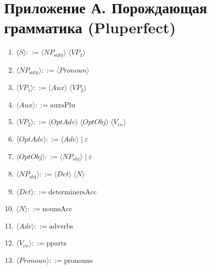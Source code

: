 \documentclass[areasetadvanced]{scrartcl}
\begin{document}
\newpage
\section*{Приложение А. Порождающая грамматика (Pluperfect)}
\begin{enumerate}
  \item $\langle S\rangle            ::= \langle NP_{\text{subj}}\rangle\;\langle VP_1\rangle$
  \item $\langle NP_{\text{subj}}\rangle ::= \langle Pronoun\rangle$
  \item $\langle VP_1\rangle         ::= \langle Aux\rangle\;\langle VP_2\rangle$
  \item $\langle Aux\rangle          ::= \text{auxsPlu}$
  \item $\langle VP_2\rangle         ::= \langle OptAdv\rangle\;\langle OptObj\rangle\;\langle V_{en}\rangle$
  \item $\langle OptAdv\rangle       ::= \langle Adv\rangle \;|\; \varepsilon$
  \item $\langle OptObj\rangle       ::= \langle NP_{\text{obj}}\rangle \;|\; \varepsilon$
  \item $\langle NP_{\text{obj}}\rangle ::= \langle Det\rangle\;\langle N\rangle$
  \item $\langle Det\rangle          ::= \text{determinersAcc}$
  \item $\langle N\rangle            ::= \text{nounsAcc}$
  \item $\langle Adv\rangle          ::= \text{adverbs}$
  \item $\langle V_{en}\rangle       ::= \text{pparts}$
  \item $\langle Pronoun\rangle      ::= \text{pronouns}$
\end{enumerate}
\end{document}
